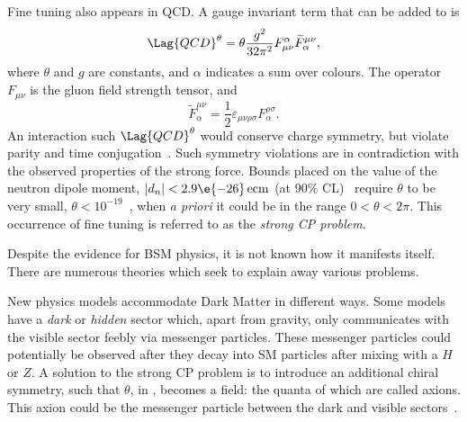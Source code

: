 Fine tuning also appears in QCD.
A gauge invariant term that can be added to  is
\begin{equation}
  \Lag{QCD}^\theta = \theta\frac{g^2}{32\pi^2}
  F_{\mu\nu}^\alpha\widetilde F^{\mu\nu}_\alpha,
  \label{eq:strongcp}
\end{equation}
where $\theta$ and $g$ are constants, and $\alpha$ indicates a sum over colours.
The operator $F_{\mu\nu}$ is the gluon field strength tensor, and
\begin{equation}
  \widetilde F^{\mu\nu}_\alpha = \frac12\varepsilon_{\mu\nu\rho\sigma}F^{\rho\sigma}_\alpha.
\end{equation}
An interaction such $\Lag{QCD}^\theta$ would conserve charge symmetry, but violate parity and time
conjugation~\cite{Peccei:2006as}.
Such symmetry violations are in contradiction with the observed properties of the strong
force.
Bounds placed on the value of the neutron dipole moment, $|d_n| <2.9\e{-26}\,\mathrm{ecm}$
(at 90\% CL)~\cite{Baker:2006ts} require $\theta$ to be very small,
$\theta<10^{-19}$~\cite{Crewther:PQref9}, when \emph{a priori} it could be in the range
$0<\theta<2\pi$.
This occurrence of fine tuning is referred to as the \emph{strong CP problem}.


Despite the evidence for BSM physics, it is not known how it manifests itself.
There are numerous theories which seek to explain away various problems.

New physics models accommodate Dark Matter in different ways.
Some models have a \emph{dark} or \emph{hidden} sector which, apart from gravity, only
communicates with the visible sector feebly via messenger particles.
These messenger particles could potentially be observed after they decay into SM particles after
mixing with a $H$ or $Z$.
A solution to the strong CP problem is to introduce an additional chiral symmetry, such that
$\theta$, in , becomes a field: the quanta of which are called axions.
This axion could be the messenger particle between the dark and visible
sectors~\cite{Peccei:2006as}.


